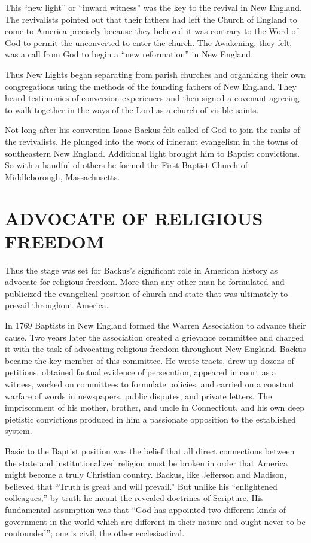 This “new light” or “inward witness” was the key to the revival in New England. The revivalists
pointed out that their fathers had left the Church of England to come to America precisely because
they believed it was contrary to the Word of God to permit the unconverted to enter the church. The
Awakening, they felt, was a call from God to begin a “new reformation” in New England.

Thus New Lights began separating from parish churches and organizing their own congregations using
the methods of the founding fathers of New England. They heard testimonies of conversion experiences
and then signed a covenant agreeing to walk together in the ways of the Lord as a church of visible
saints.

Not long after his conversion Isaac Backus felt called of God to join the ranks of the revivalists.
He plunged into the work of itinerant evangelism in the towns of southeastern New England.
Additional light brought him to Baptist convictions. So with a handful of others he formed the First
Baptist Church of Middleborough, Massachusetts.

\section{ADVOCATE OF RELIGIOUS FREEDOM}

Thus the stage was set for Backus’s significant role in American history as advocate for religious
freedom. More than any other man he formulated and publicized the evangelical position of church and
state that was ultimately to prevail throughout America.

In 1769 Baptists in New England formed the Warren Association to advance their cause. Two years
later the association created a grievance committee and charged it with the task of advocating
religious freedom throughout New England. Backus became the key member of this committee. He wrote
tracts, drew up dozens of petitions, obtained factual evidence of persecution, appeared in court as
a witness, worked on committees to formulate policies, and carried on a constant warfare of words in
newspapers, public disputes, and private letters. The imprisonment of his mother, brother, and uncle
in Connecticut, and his own deep pietistic convictions produced in him a passionate opposition to
the established system.

Basic to the Baptist position was the belief that all direct connections between the state and
institutionalized religion must be broken in order that America might become a truly Christian
country. Backus, like Jefferson and Madison, believed that “Truth is great and will prevail.” But
unlike his “enlightened colleagues,” by truth he meant the revealed doctrines of Scripture. His
fundamental assumption was that “God has appointed two different kinds of government in the world
which are different in their nature and ought never to be confounded”; one is civil, the other
ecclesiastical.

